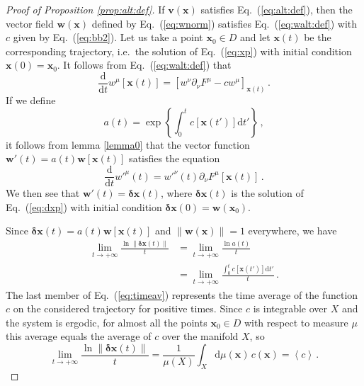 \documentclass{article}
\theoremstyle{plain}
\theoremstyle{definition}
\theoremstyle{remark}
\newcommand{\vect}[1]{\boldsymbol{#1}}
\begin{document}
\begin{proof}[Proof of Proposition \ref{prop:alt:def}]
If $\vect{v}(\vect{x})$ satisfies Eq.~(\ref{eq:alt:def}), then
the vector field $\vect{w}(\vect{x})$ defined by Eq.~(\ref{eq:wnorm})
satisfies Eq.~(\ref{eq:walt:def}) with $c$ given by Eq.~(\ref{eq:bb2}).
  Let us take a point $\vect{x}_0\in D$ and let $\vect{x}(t)$ be the
  corresponding trajectory, i.e.\ the solution of Eq.~(\ref{eq:xp})
  with initial condition $\vect{x}(0)=\vect{x}_0$.  It follows from
Eq.~(\ref{eq:walt:def}) that
  \begin{equation}\label{eq:trajectw}
    \frac{\mathrm{d}}{\mathrm{d}t}w^{\mu} \left[\vect{x}(t)\right]
    =\left[ w^\nu \partial_\nu F^\mu  -c w^\mu\right]_{\vect{x}(t)} \,.
  \end{equation}
If we define
\begin{equation}\label{eq:sol_cauchy1}
    a(t)=\exp\left\{\int_0^t c\left[\vect{x}(t')\right]
        {\mathrm{d}}t' \right\}\,,
  \end{equation} 
it follows from lemma \ref{lemma0} that the vector function
$\vect w'(t)=a(t)\vect{w}\left[\vect{x}(t)\right]$ satisfies the equation
\begin{equation}
 \frac{\mathrm{d}}{\mathrm{d}t}w'^{\mu} (t)
    = w'^\nu (t)\partial_\nu F^\mu\left[\vect{x}(t)\right] \,.
\end{equation}
We then see that $\vect w'(t)=\vect{\delta x}(t)$, where 
$\vect{\delta x}(t)$ is the solution of Eq.~(\ref{eq:dxp}) with initial condition 
$\vect{\delta  x}(0)=\vect{w}(\vect{x}_0)$.

Since $\vect{\delta x}(t)=a(t)\vect{w}\left[\vect{x}(t)\right]$ and
$\lVert \vect{w}\left(\vect {x}\right) \rVert=1$ everywhere,
we have
  \begin{align}
    \label{eq:timeav}
    \lim_{t\to +\infty} \frac{\ln \lVert \vect{\delta x}(t) \rVert}{t}  
    & =\lim_{t\to +\infty}\frac{\ln a(t)}{t}    \nonumber \\
    &    =\lim_{t\to +\infty}\frac{\int_0^t c\left[\vect{x}(t')\right]
{\mathrm{d}}t'}{t} \, .
  \end{align}
  The last member of Eq.~(\ref{eq:timeav}) represents the time average
  of the function $c$ on the considered trajectory for
  positive times. Since $c$ is integrable over $X$ and the
system is ergodic, for almost all the points  $\vect{x}_0\in D$ with
respect to measure $\mu$
this average equals the average of $c$ over the
manifold $X$, so 
\[
 \lim_{t\to +\infty} \frac{\ln \lVert \vect{\delta x}(t) \rVert}{t}=
\frac {1}{\mu(X)}
    \int_X \mathrm{d}\mu (\vect{x})\, c(\vect{x})
=\left<c\right>\,.
\]
  

\end{proof}
\end{document}
